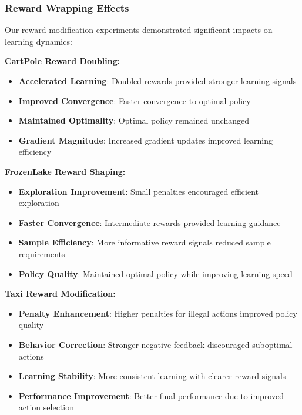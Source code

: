 \documentclass[12pt]{article}
\begin{document}
{{{\subsubsection{Reward Wrapping Effects}

Our reward modification experiments demonstrated significant impacts on learning dynamics:

\textbf{CartPole Reward Doubling:}
\begin{itemize}
    \item \textbf{Accelerated Learning}: Doubled rewards provided stronger learning signals
    \item \textbf{Improved Convergence}: Faster convergence to optimal policy
    \item \textbf{Maintained Optimality}: Optimal policy remained unchanged
    \item \textbf{Gradient Magnitude}: Increased gradient updates improved learning efficiency
\end{itemize}

\textbf{FrozenLake Reward Shaping:}
\begin{itemize}
    \item \textbf{Exploration Improvement}: Small penalties encouraged efficient exploration
    \item \textbf{Faster Convergence}: Intermediate rewards provided learning guidance
    \item \textbf{Sample Efficiency}: More informative reward signals reduced sample requirements
    \item \textbf{Policy Quality}: Maintained optimal policy while improving learning speed
\end{itemize}

\textbf{Taxi Reward Modification:}
\begin{itemize}
    \item \textbf{Penalty Enhancement}: Higher penalties for illegal actions improved policy quality
    \item \textbf{Behavior Correction}: Stronger negative feedback discouraged suboptimal actions
    \item \textbf{Learning Stability}: More consistent learning with clearer reward signals
    \item \textbf{Performance Improvement}: Better final performance due to improved action selection
\end{itemize}

}}


}
\end{document}
